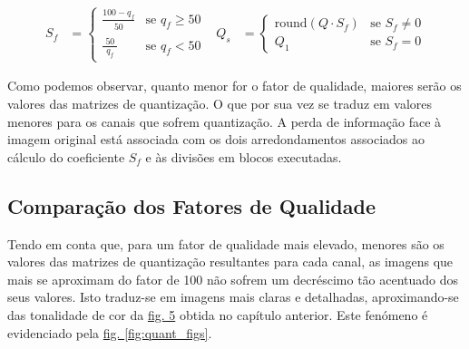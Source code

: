 \documentclass{article}
\begin{document}
\begin{align*}
S_f &= 
\begin{cases}
    \frac{100 - q_f}{\substack{50}} & \text{se } q_f \geq 50 \\
    \frac{50}{\substack{q_f}} & \text{se } q_f < 50
\end{cases} &
Q_s &= 
\begin{cases}
    \text{round}(Q \cdot S_f) & \text{se } S_f \neq 0 \\
    Q_1 & \text{se } S_f = 0
\end{cases}
\end{align*}

Como podemos observar, quanto menor for o fator de qualidade, maiores serão os valores das matrizes de quantização. O que por sua vez se traduz em valores menores para os canais que sofrem quantização. A perda de informação face à imagem original está associada com os dois arredondamentos associados ao cálculo do coeficiente $S_f$ e às divisões em blocos executadas.



\subsection{Comparação dos Fatores de Qualidade}

Tendo em conta que, para um fator de qualidade mais elevado, menores são os valores das matrizes de quantização resultantes para cada canal, as imagens que mais se aproximam do fator de 100 não sofrem um decréscimo tão acentuado dos seus valores. Isto traduz-se em imagens mais claras e detalhadas, aproximando-se das tonalidade de cor da \hyperref[fig:y_dct_8]{fig. 5} obtida no capítulo anterior. Este fenómeno é evidenciado pela \hyperref[fig:quant_figs]{fig. \ref{fig:quant_figs}}.
\end{document}
